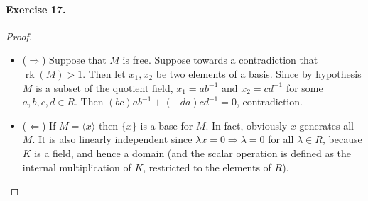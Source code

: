 \documentclass[12pt,a4paper]{report}
\theoremstyle{definition}
\theoremstyle{num.custom-title}
\DeclareMathOperator{\rk}{rk}
\DeclareMathOperator{\imp}{\Rightarrow}
\begin{document}
\paragraph{Exercise 17.} 
\begin{proof}\ 
\begin{itemize}
\item ($\Longrightarrow$) Suppose that $M$ is free. Suppose towards a contradiction that $\rk(M)>1$. Then let $x_1,x_2$ be two elements of a basis. Since by hypothesis $M$ is a subset of the quotient field, $x_1=ab^{-1}$ and $x_2=cd^{-1}$ for some $a,b,c,d \in R$. Then $(bc)ab^{-1}+(-da)cd^{-1}=0$, contradiction.
\item ($\Longleftarrow$) If $M=\langle x \rangle$ then $\{x\}$ is a base for $M$. In fact, obviously $x$ generates all $M$. It is also linearly independent since $\lambda x = 0 \imp \lambda=0$ for all $\lambda \in R$, because $K$ is a field, and hence a domain (and the scalar operation is defined as the internal multiplication of $K$, restricted to the elements of $R$).
\end{itemize}
\end{proof}
\end{document}
